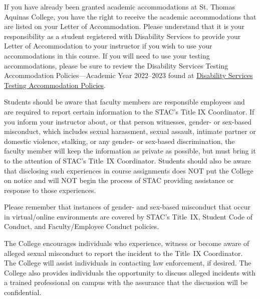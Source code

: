 \documentclass[11pt,letterpaper]{article}
\begin{document}
If you have already been granted academic accommodations at St. Thomas Aquinas College, you have the right to receive the academic accommodations that are listed on your Letter of Accommodation. Please understand that it is your responsibility as a student registered with Disability Services to provide your Letter of Accommodation to your instructor if you wish to use your accommodations in this course. If you will need to use your testing accommodations, please be sure to review the Disability Services Testing Accommodation Policies---Academic Year 2022--2023 found at \href{https://docs.google.com/document/d/1V5iUtgypiS8kClqhSLPde7AOSZPoLu6CsIDcpiEic2w/edit?usp=sharing}{Disability Services Testing Accommodation Policies}. \sectionbreak




Students should be aware that faculty members are responsible employees and are required to report certain information to the STAC’s Title IX Coordinator. If you inform your instructor about, or that person witnesses, gender- or sex-based misconduct, which includes sexual harassment, sexual assault, intimate partner or domestic violence, stalking, or any gender- or sex-based discrimination, the faculty member will keep the information as private as possible, but must bring it to the attention of STAC’s Title~IX Coordinator. 
Students should also be aware that disclosing such experiences in course assignments does NOT put the College on notice and will NOT begin the process of STAC providing assistance or response to those experiences. \pspace

Please remember that instances of gender- and sex-based misconduct that occur in virtual/online environments are covered by STAC’s Title~IX, Student Code of Conduct, and Faculty/Employee Conduct policies. \pspace

The College encourages individuals who experience, witness or become aware of alleged sexual misconduct to report the incident to the Title~IX Coordinator. The College will assist individuals in contacting law enforcement, if desired. The College also provides individuals the opportunity to discuss alleged incidents with a trained professional on campus with the assurance that the discussion will be confidential. \pspace
\end{document}
